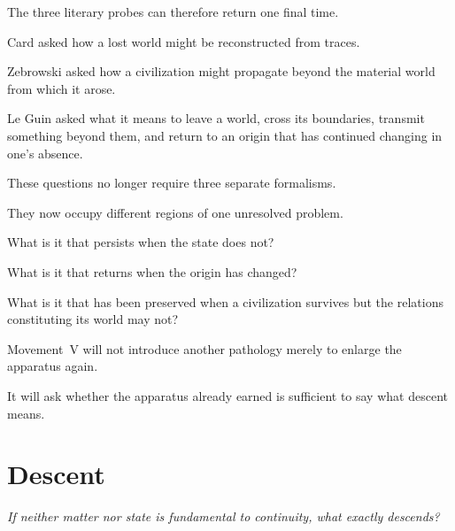 \documentclass[
  11pt,
  a4paper,
  DIV=12,
  BCOR=0mm,
  parskip=half-
]{scrartcl}
\theoremstyle{definition}
\theoremstyle{plain}
\theoremstyle{remark}
\newcommand{\movementquestion}[1]{%
  \begin{center}
    \small\itshape
    #1
  \end{center}
  \medskip
}
\begin{document}
The three literary probes can therefore return one final time.

Card asked how a lost world might be reconstructed from traces.

Zebrowski asked how a civilization might propagate beyond the material world
from which it arose.

Le Guin asked what it means to leave a world, cross its boundaries, transmit
something beyond them, and return to an origin that has continued changing in
one's absence.

These questions no longer require three separate formalisms.

They now occupy different regions of one unresolved problem.

What is it that persists when the state does not?

What is it that returns when the origin has changed?

What is it that has been preserved when a civilization survives but the
relations constituting its world may not?

Movement~V will not introduce another pathology merely to enlarge the
apparatus again.

It will ask whether the apparatus already earned is sufficient to say what
descent means.


\section{Descent}
\label{mov:descent}

\movementquestion{If neither matter nor state is fundamental to continuity, what exactly descends?}
\end{document}
